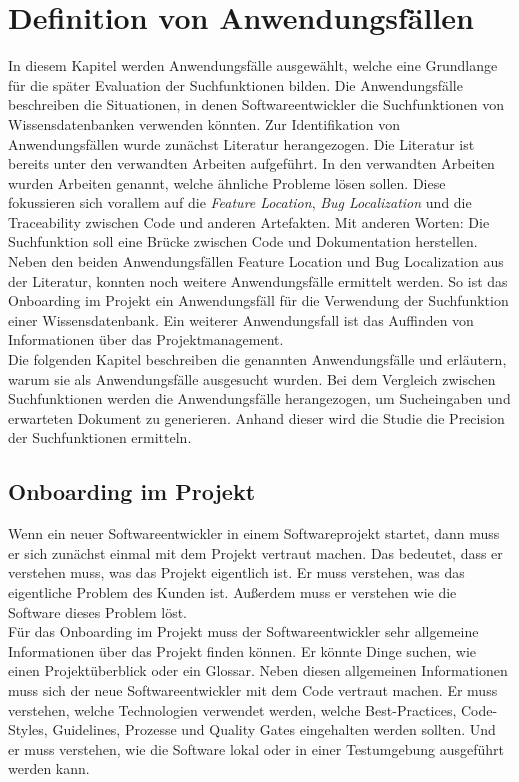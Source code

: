 \chapter{Definition von Anwendungsfällen}
\label{chap:anwendungsfaelle}
In diesem Kapitel werden Anwendungsfälle ausgewählt, welche eine Grundlange für die später Evaluation der Suchfunktionen bilden.
Die Anwendungsfälle beschreiben die Situationen, in denen Softwareentwickler die Suchfunktionen von Wissensdatenbanken verwenden könnten.
Zur Identifikation von Anwendungsfällen wurde zunächst Literatur herangezogen.
Die Literatur ist bereits unter den verwandten Arbeiten aufgeführt.
In den verwandten Arbeiten wurden Arbeiten genannt, welche ähnliche Probleme lösen sollen.
Diese fokussieren sich vorallem auf die \textit{Feature Location}, \textit{Bug Localization} und die Traceability zwischen Code und anderen Artefakten.
Mit anderen Worten: Die Suchfunktion soll eine Brücke zwischen Code und Dokumentation herstellen.
Neben den beiden Anwendungsfällen Feature Location und Bug Localization aus der Literatur, konnten noch weitere Anwendungsfälle ermittelt werden.
So ist das Onboarding im Projekt ein Anwendungsfäll für die Verwendung der Suchfunktion einer Wissensdatenbank.
Ein weiterer Anwendungsfall ist das Auffinden von Informationen über das Projektmanagement.\\

Die folgenden Kapitel beschreiben die genannten Anwendungsfälle und erläutern, warum sie als Anwendungsfälle ausgesucht wurden.
Bei dem Vergleich zwischen Suchfunktionen werden die Anwendungsfälle herangezogen, um Sucheingaben und erwarteten Dokument zu generieren.
Anhand dieser wird die Studie die Precision der Suchfunktionen ermitteln.

\section{Onboarding im Projekt}
Wenn ein neuer Softwareentwickler in einem Softwareprojekt startet, dann muss er sich zunächst einmal mit dem Projekt vertraut machen.
Das bedeutet, dass er verstehen muss, was das Projekt eigentlich ist.
Er muss verstehen, was das eigentliche Problem des Kunden ist.
Außerdem muss er verstehen wie die Software dieses Problem löst.\\

Für das Onboarding im Projekt muss der Softwareentwickler sehr allgemeine Informationen über das Projekt finden können.
Er könnte Dinge suchen, wie einen Projektüberblick oder ein Glossar.
Neben diesen allgemeinen Informationen muss sich der neue Softwareentwickler mit dem Code vertraut machen.
Er muss verstehen, welche Technologien verwendet werden, welche Best-Practices, Code-Styles, Guidelines, Prozesse und Quality Gates eingehalten werden sollten.
Und er muss verstehen, wie die Software lokal oder in einer Testumgebung ausgeführt werden kann.\\

